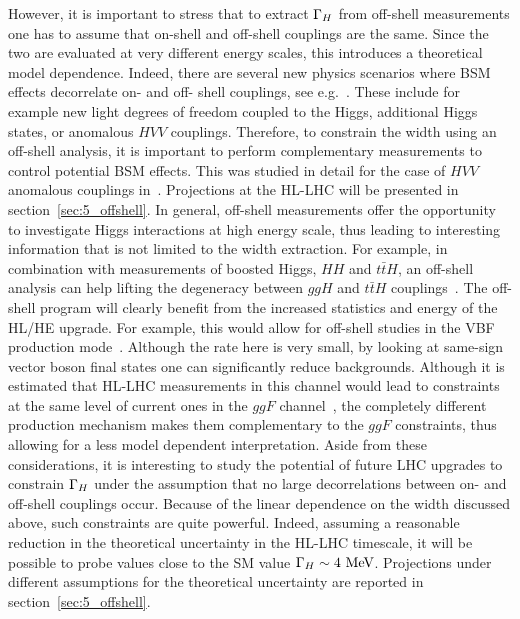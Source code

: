 However, it is important to stress that to extract ${\Gamma_H}$ from off-shell
measurements one has to assume that on-shell and off-shell couplings are the same. Since the two
are evaluated at very different energy scales, this introduces a theoretical model dependence. 
Indeed, there are several new physics scenarios where BSM effects decorrelate on- and off- shell 
couplings, see e.g.~\cite{Englert:2014aca,Logan:2014ppa,Englert:2014ffa}. 
These include for example new light degrees of freedom coupled to the Higgs,
additional Higgs states, or anomalous $HVV$ couplings. Therefore, to constrain the width using an off-shell analysis,
 it is important to perform complementary measurements to control potential BSM effects. 
This was studied in detail for the case of $HVV$ anomalous couplings in~\cite{Anderson:2013afp}. 
 Projections at the HL-LHC will be presented in section~\ref{sec:5_offshell}. 
In general, off-shell measurements offer the opportunity to investigate Higgs interactions at 
high energy scale, thus leading to interesting information that is not limited to the width
extraction. For example, in combination with measurements of boosted Higgs, $HH$ and $t\bar tH$, 
an off-shell analysis can help lifting the degeneracy between $ggH$ and $t\bar tH$ 
couplings~\cite{Azatov:2014jga}. The off-shell program will clearly benefit from the 
increased statistics and energy of the HL/HE upgrade. For example, this would allow for 
off-shell studies in the VBF production mode~\cite{Campbell:2015vwa}. 
Although the rate here is very small,
by looking at same-sign vector boson final states one can significantly reduce backgrounds. 
%
Although it is estimated that HL-LHC measurements in this channel would lead to constraints
at the same level of current ones in the $ggF$ channel~\cite{Campbell:2015vwa}, 
the completely different 
production mechanism
makes them complementary to the $ggF$ constraints, thus allowing for a less model dependent
interpretation.
%
Aside from these considerations, it is interesting to study the potential of 
future LHC upgrades to constrain ${\Gamma_H}$ under the assumption that 
no large decorrelations between on- and off-shell couplings occur. Because of the linear dependence on
the width discussed above, such constraints are quite powerful. Indeed, assuming a reasonable
reduction in the theoretical uncertainty in the HL-LHC timescale, 
it will be possible to probe values close to the SM value
${\Gamma_H}\sim 4~{\rm MeV}$. Projections under different assumptions for the theoretical uncertainty
are reported in section~\ref{sec:5_offshell}. 

